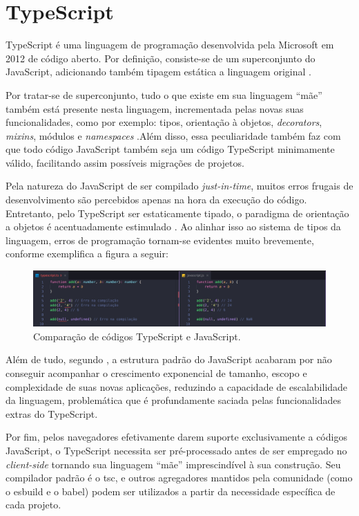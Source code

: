 \section{TypeScript}
\label{sec:typescript}
TypeScript é uma linguagem de programação desenvolvida pela Microsoft em 2012 de código aberto. Por definição, consiste-se de um superconjunto do JavaScript, adicionando também tipagem estática a linguagem original \cite{Microsoft2023}.

Por tratar-se de superconjunto, tudo o que existe em sua linguagem “mãe” também está presente nesta linguagem, incrementada pelas novas suas funcionalidades, como por exemplo: tipos, orientação à objetos, \textit{decorators}, \textit{mixins}, módulos e \textit{namespaces} \cite{Goldberg2022}.Além disso, essa peculiaridade também faz com que todo código JavaScript também seja um código TypeScript minimamente válido, facilitando assim possíveis migrações de projetos.

Pela natureza do JavaScript de ser compilado \textit{just-in-time}, muitos erros frugais de desenvolvimento são percebidos apenas na hora da execução do código. Entretanto, pelo TypeScript ser estaticamente tipado, o paradigma de orientação a objetos é acentuadamente estimulado \cite{Goldberg2022}. Ao alinhar isso ao sistema de tipos da linguagem, erros de programação tornam-se evidentes muito brevemente, conforme exemplifica a  figura a seguir:

\begin{figure}[H]
    \centering
    \caption{Comparação de códigos TypeScript e JavaScript.}
    \label{fig:typescript}
    \includegraphics[width=1\textwidth]{data/figures/typescript-javascript.jpg}
\end{figure}

Além de tudo, segundo , a estrutura padrão do JavaScript acabaram por não conseguir acompanhar o crescimento exponencial de tamanho, escopo e complexidade de suas novas aplicações, reduzindo a capacidade de escalabilidade da linguagem, problemática que é profundamente saciada pelas funcionalidades extras do TypeScript.

Por fim, pelos navegadores efetivamente darem suporte exclusivamente a códigos JavaScript, o TypeScript necessita ser pré-processado antes de ser empregado no \textit{client-side} tornando sua linguagem “mãe” imprescindível à sua construção. Seu compilador padrão é o tsc, e outros agregadores mantidos pela comunidade (como o esbuild e o babel) podem ser utilizados a partir da necessidade específica de cada projeto.

